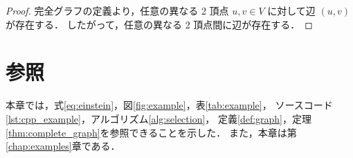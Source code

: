 \begin{proof}
完全グラフの定義より，任意の異なる 2 頂点 $u, v \in V$ に対して辺 $(u, v)$ が存在する．
したがって，任意の異なる 2 頂点間に辺が存在する．
\end{proof}

\section{参照}
\label{sec:reference}

本章では，式\ref{eq:einstein}，図\ref{fig:example}，表\ref{tab:example}，
ソースコード\ref{lst:cpp_example}，アルゴリズム\ref{alg:selection}，
定義\ref{def:graph}，定理\ref{thm:complete_graph}を参照できることを示した．
また，本章は第\ref{chap:examples}章である．
